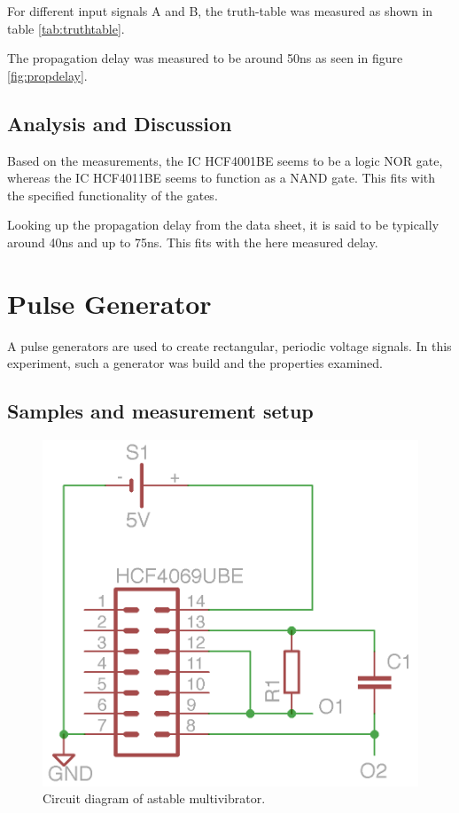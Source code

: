 \documentclass[journal]{IEEEtran}
\begin{document}
For different input signals A and B, the truth-table was measured as
shown in table \ref{tab:truthtable}.

The propagation delay was measured to be around 50ns as seen in figure
\ref{fig:propdelay}.

\subsection{Analysis and Discussion}

Based on the measurements, the IC HCF4001BE seems to be a logic NOR gate,
whereas the IC HCF4011BE seems to function as a NAND gate. This fits with the
specified functionality of the gates.

Looking up the propagation delay from the data sheet, it is said to be typically
around 40ns and up to 75ns. This fits with the here measured delay.

\section{Pulse Generator}

A pulse generators are used to create rectangular, periodic voltage signals. In
this experiment, such a generator was build and the properties examined. 

\subsection{Samples and measurement setup}

\begin{figure}[h!]
  \centering
   \includegraphics[]{boards/astabil_multivibrator.png}
   \caption{Circuit diagram of astable multivibrator.}
   \label{fig:am_board}
\end{figure}
\end{document}
